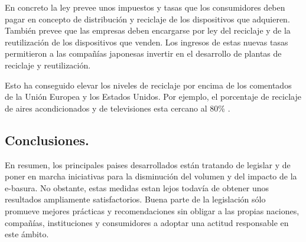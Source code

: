 En concreto la ley prevee unos impuestos y tasas que los consumidores deben pagar en concepto de distribución y reciclaje de los dispositivos que adquieren. También prevee que las empresas deben encargarse por ley del reciclaje y de la reutilización de los dispositivos que venden. Los ingresos de estas nuevas tasas permitieron a las compañías japonesas invertir en el desarrollo de plantas de reciclaje y reutilización. 

Esto ha conseguido elevar los niveles de reciclaje por encima de los comentados de la Unión Europea y los Estados Unidos. Por ejemplo, el porcentaje de reciclaje de aires acondicionados y de televisiones esta cercano al 80\% \cite{japan-report}.

\subsection{Conclusiones.}

En resumen, los principales paises desarrollados están tratando de legislar y de poner en marcha iniciativas para la disminución del volumen y del impacto de la e-basura. No obstante, estas medidas estan lejos todavía de obtener unos resultados ampliamente satisfactorios. Buena parte de la legislación sólo promueve mejores prácticas y recomendaciones sin obligar a las propias naciones, compañías, instituciones y consumidores a adoptar una actitud responsable en este ámbito.